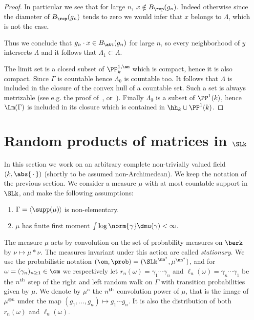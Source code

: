 \begin{proof}
In particular we see that for large $n$, $x\notin B_{\rep}(g_n)$. Indeed otherwise since the diameter of $B_{\rep}(g_n)$ tends to zero we would infer that $x$ belongs to $\Lambda$, which is not the case.

Thus we conclude that $g_n\cdot x\in B_{\att}(g_n)$ for large $n$, so every neighborhood of $y$ intersects $\Lambda$ and it follows that $\Lambda_1\subset\Lambda$.


The limit set is a closed subset of $\PP^{1,\an}_k$ which is compact, hence it is also compact. Since $\Gamma$ is countable hence $\Lambda_0$ is countable too. It follows that $\Lambda$ is included in the closure of the convex hull of a countable set. Such a set is always metrizable (see e.g. the proof of~\cite[Lem.~7.15]{valtree}, or~\cite[Lem.~5.7]{baker-rumely}). Finally $\Lambda_0$ is a subset of $\PP^1(k)$, hence $\Lm(\Gamma)$ is included in its closure which is contained in $\hh_k \cup \PP^1(k)$.
\end{proof}


\section{Random products of matrices in \texorpdfstring{$\SLk$}{SLk}}\label{sec:furstenberg}

In this section we work on an arbitrary complete non-trivially valued field $(k, \abs{{\,\cdot\,}})$ (shortly to be assumed non-Archimedean). We keep the notation of the previous section. We consider a measure $\mu$ with at most countable support in $\SLk$, and make the following assumptions:
\begin{enumerate}\renewcommand{\theenumi}{B\arabic{enumi}}
\item \label{B1} $\Gamma = \langle \supp(\mu) \rangle$ is non-elementary.
\item \label{B2} $\mu$ has finite first moment $ \int \log \norm{\gamma} \dmu(\gamma)<\infty$.
\end{enumerate}

The measure $\mu$ acts by convolution on the set of probability measures on $\berk$ by $\nu \mapsto \mu \ast \nu$. The measures invariant under this action are called \emph{stationary}. We use the probabilistic notation $(\om, \prob) = (\SLk^{\nn^*}, \mu^{\nn^*})$, and for $\omega = (\gamma_n)_{n\geq 1}\in \om$ we respectively let $r_n(\omega) = \gamma_1\cdots \gamma_n$ and $\ell_n(\omega) = \gamma_n\cdots \gamma_1$ be the $n^{\rm th}$ step of the right and left random walk on $\Gamma$ with transition probabilities given by $\mu$. We denote by $\mu^n$ the $n^{\rm th}$ convolution power of $\mu$, that is the image of $\mu^ {\otimes n}$ under the map $(g_1, \ldots,g_n)\mapsto g_1\cdots g_n$. It is also the distribution of both $r_n(\omega)$ and $\ell_n(\omega)$.


